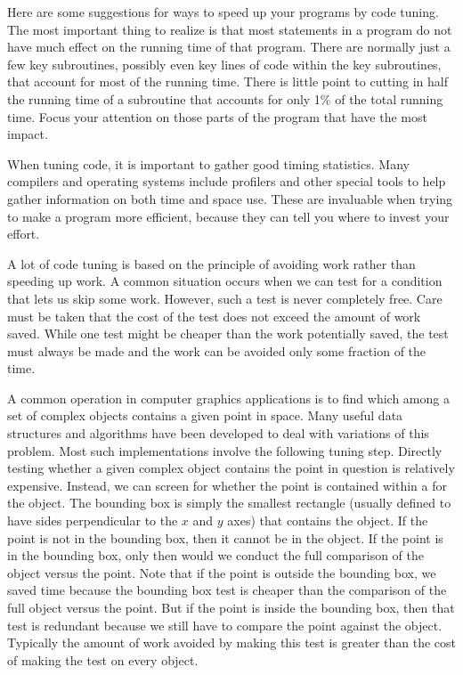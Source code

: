 Here are some suggestions for ways to speed up your
programs by code tuning.
The most important thing to realize is that most statements in a
program do not have much effect on the running time of that program.
There are normally just a few key subroutines, possibly even key
lines of code within the key subroutines, that account for most of
the running time.
There is little point to cutting in half the running time of a
subroutine that accounts for only 1\% of the total running time.
Focus your attention on those parts of the program that have the most
impact.

When tuning code, it is important to gather good timing statistics.
Many compilers and
operating systems
include profilers and other special tools to help gather information
on both time and space use.
These are invaluable when trying to make a program more efficient,
because they can tell you where to invest your effort.

A lot of code tuning is based on the principle of avoiding work rather
than speeding up work.
A common situation occurs when we can test for a condition that lets
us skip some work.
However, such a test is never completely free.
Care must be taken that the cost of the test does not exceed the
amount of work saved.
While one test might be cheaper than the work potentially saved, the
test must always be made and the work can be avoided only some
fraction of the time.

\begin{example}
A common operation in computer graphics applications is to find which
among a set of complex objects contains a given point in space.
Many useful data structures and algorithms have been developed to deal
with variations of this problem.
Most such implementations involve the following tuning step.
Directly testing whether a given complex object contains the point in
question is relatively expensive.
Instead, we can screen for whether the point is contained within a
 for the object.
The bounding box is simply the smallest rectangle (usually defined to
have sides perpendicular to the \(x\) and \(y\) axes) that contains
the object.
If the point is not in the bounding box, then it cannot be in the
object.
If the point is in the bounding box, only then would we conduct the
full comparison of the object versus the point.
Note that if the point is outside the bounding box, we saved time
because the bounding box test is cheaper than the comparison of the
full object versus the point.
But if the point is inside the bounding box, then that test is
redundant because we still have to compare the point against the
object.
Typically the amount of work avoided by making this test is greater
than the cost of making the test on every object.
\end{example}

